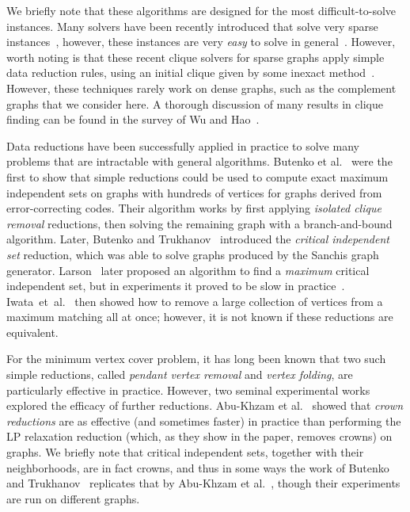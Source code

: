 \documentclass[twoside,leqno,twocolumn]{article}
\newcommand{\etal}{et~al.\xspace}
\begin{document}
We briefly note that these algorithms are designed for the
most difficult-to-solve instances. Many solvers have been recently introduced
that solve very sparse instances~\cite{rossi-2015,verma2015solving,sansegundo2016a,chang2019efficient}, however, these
instances are very \emph{easy} to solve in general~\cite{walters-2018}.
%
%
However, worth noting is that these recent clique solvers for sparse graphs apply simple data reduction rules, using an initial clique given by some inexact method~\cite{verma2015solving,sansegundo2016a,chang2019efficient}. However, these techniques rarely work on dense graphs, such as the complement graphs that we consider here.
A thorough discussion of many results in clique finding can be found in the survey of Wu and Hao~\cite{wu-hao-2015}.

Data reductions have been successfully applied in practice to solve many problems that are intractable with general algorithms. Butenko et al.~\cite{butenko-2002,butenko-correcting-codes-2009} were the first to show that simple reductions could be used to compute exact maximum independent sets on graphs with hundreds of vertices for graphs derived from error-correcting codes. Their algorithm works by first applying \emph{isolated clique removal} reductions, then solving the remaining graph with a branch-and-bound algorithm. Later, Butenko and Trukhanov~\cite{butenko-trukhanov} introduced the \emph{critical independent set} reduction, which was able to solve graphs produced by the Sanchis graph generator.
Larson~\cite{larson-2007} later proposed an algorithm to find a \emph{maximum} critical independent set, but in experiments it proved to be slow in practice~\cite{strash2016power}.
Iwata~\etal~\cite{iwata-2014} then showed how to remove a large collection of vertices from a maximum matching all at once; however, it is not known if these reductions are equivalent.

For the minimum vertex cover problem, it has long been known that two such simple reductions, called \emph{pendant vertex removal} and \emph{vertex folding}, are particularly effective in practice. However, two seminal experimental works explored the efficacy of further reductions. Abu-Khzam et al.~\cite{abu-khzam-2007} showed that \emph{crown reductions} are as effective (and sometimes faster) in practice than performing the LP relaxation reduction (which, as they show in the paper, removes crowns) on graphs. We briefly note that critical independent sets, together with their neighborhoods, are in fact crowns, and thus in some ways the work of Butenko and Trukhanov~\cite{butenko-trukhanov} replicates that by Abu-Khzam et al.~\cite{abu-khzam-2007}, though their experiments are run on different graphs.
\end{document}
